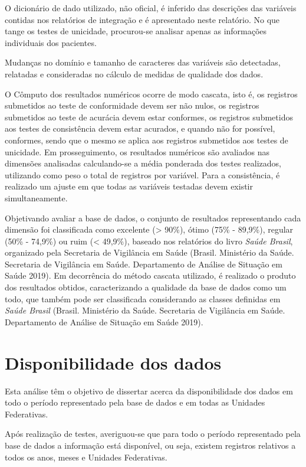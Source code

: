\documentclass[
  12,
  table]{proadi}
\begin{document}
O dicionário de dado utilizado, não oficial, é inferido das descrições
das variáveis contidas nos relatórios de integração e é apresentado
neste relatório. No que tange os testes de unicidade, procurou-se
analisar apenas as informações individuais dos pacientes.

Mudanças no domínio e tamanho de caracteres das variáveis são
detectadas, relatadas e consideradas no cálculo de medidas de qualidade
dos dados.

O Cômputo dos resultados numéricos ocorre de modo cascata, isto é, os
registros submetidos ao teste de conformidade devem ser não nulos, os
registros submetidos ao teste de acurácia devem estar conformes, os
registros submetidos aos testes de consistência devem estar acurados, e
quando não for possível, conformes, sendo que o mesmo se aplica aos
registros submetidos aos testes de unicidade. Em prosseguimento, os
resultados numéricos são avaliados nas dimensões analisadas
calculando-se a média ponderada dos testes realizados, utilizando como
peso o total de registros por variável. Para a consistência, é realizado
um ajuste em que todas as variáveis testadas devem existir
simultaneamente.

Objetivando avaliar a base de dados, o conjunto de resultados
representando cada dimensão foi classificada como excelente
(\textgreater{} 90\%), ótimo (75\% - 89,9\%), regular (50\% - 74,9\%) ou
ruim (\textless{} 49,9\%), baseado nos relatórios do livro \emph{Saúde
Brasil}, organizado pela Secretaria de Vigilância em Saúde (Brasil.
Ministério da Saúde. Secretaria de Vigilância em Saúde. Departamento de
Análise de Situação em Saúde 2019). Em decorrência do método cascata
utilizado, é realizado o produto dos resultados obtidos, caracterizando
a qualidade da base de dados como um todo, que também pode ser
classificada considerando as classes definidas em \emph{Saúde Brasil}
(Brasil. Ministério da Saúde. Secretaria de Vigilância em Saúde.
Departamento de Análise de Situação em Saúde 2019).

\hypertarget{disponibilidade-dos-dados}{%
\section{Disponibilidade dos dados}\label{disponibilidade-dos-dados}}

Esta análise têm o objetivo de dissertar acerca da disponibilidade dos
dados em todo o período representado pela base de dados e em todas as
Unidades Federativas.

Após realização de testes, averiguou-se que para todo o período
representado pela base de dados a informação está disponível, ou seja,
existem registros relativos a todos os anos, meses e Unidades
Federativas.
\end{document}
